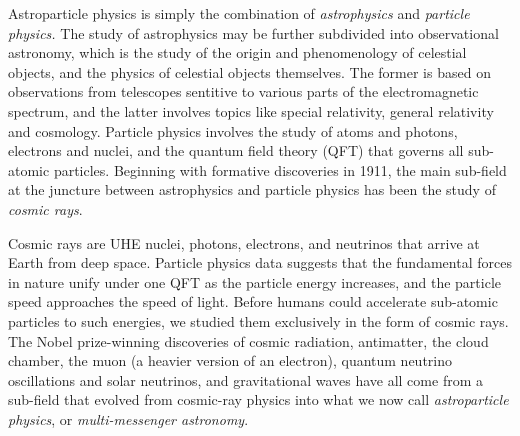 \documentclass[../../main.tex]{subfiles}
\begin{document}
Astroparticle physics is simply the combination of \textit{astrophysics} and \textit{particle physics.}  The study of astrophysics may be further subdivided into observational astronomy, which is the study of the origin and phenomenology of celestial objects, and the physics of celestial objects themselves.  The former is based on observations from telescopes sentitive to various parts of the electromagnetic spectrum, and the latter involves topics like special relativity, general relativity and cosmology.  Particle physics involves the study of atoms and photons, electrons and nuclei, and the quantum field theory (QFT) that governs all sub-atomic particles.  Beginning with formative discoveries in 1911, the main sub-field at the juncture between astrophysics and particle physics has been the study of \textit{cosmic rays}. \\ \hspace{0.1cm}

Cosmic rays are UHE nuclei, photons, electrons, and neutrinos that arrive at Earth from deep space.  Particle physics data suggests that the fundamental forces in nature unify under one QFT as the particle energy increases, and the particle speed approaches the speed of light.  Before humans could accelerate sub-atomic particles to such energies, we studied them exclusively in the form of cosmic rays.  The Nobel prize-winning discoveries of cosmic radiation, antimatter, the cloud chamber, the muon (a heavier version of an electron), quantum neutrino oscillations and solar neutrinos, and gravitational waves have all come from a sub-field that evolved from cosmic-ray physics into what we now call \textit{astroparticle physics}, or \textit{multi-messenger astronomy}. \\ \hspace{0.1cm}
\end{document}
